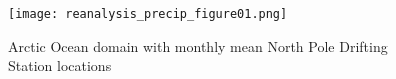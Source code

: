 \documentclass{article}
\begin{document}
\begin{figure}[h]
  \centering
  \texttt{[image: reanalysis\_precip\_figure01.png]}
  \caption{Arctic Ocean domain with monthly mean North Pole Drifting Station locations}
\end{figure}
\end{document}
